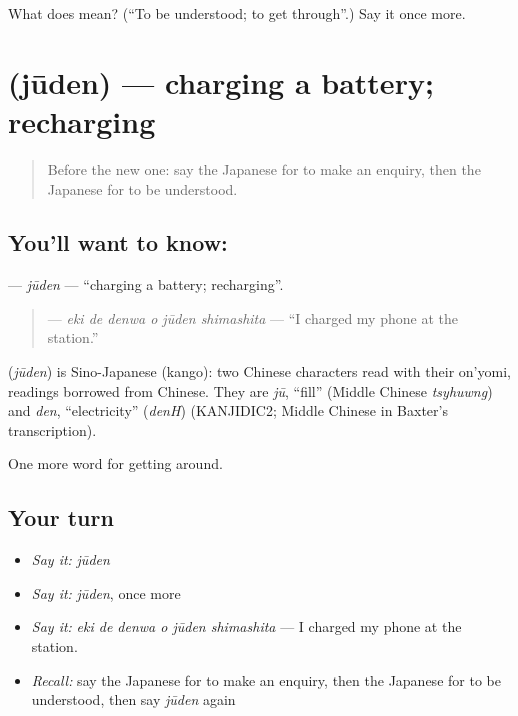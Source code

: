 \begin{tcolorbox}[breakable,colback=teal!4,colframe=teal!35!black,title={Before you move on}]
What does  mean? (\textquotedblleft{}To be understood; to get through\textquotedblright{}.) Say it once more.
\end{tcolorbox}
\section[\texorpdfstring{\ja{じゅうでん} (jūden)}{じゅうでん (jūden)}]{ (jūden) — charging a battery; recharging}

\label{lesson:JA-C425-juuden}



\begin{quote}
Before the new one: say the Japanese for to make an enquiry, then the Japanese for to be understood.
\end{quote}

\subsection*{You'll want to know: }
\textbf{} — \emph{jūden} — \textquotedblleft{}charging a battery; recharging\textquotedblright{}.

\begin{quote}
\textbf{  } — \emph{eki de denwa o jūden shimashita} — \textquotedblleft{}I charged my phone at the station.\textquotedblright{}
\end{quote}

\begin{cousinweb}
\textbf{} (\emph{jūden}) is Sino-Japanese (kango): two Chinese characters read with their on'yomi, readings borrowed from Chinese. They are \emph{jū}, \textquotedblleft{}fill\textquotedblright{} (Middle Chinese \emph{tsyhuwng}) and \emph{den}, \textquotedblleft{}electricity\textquotedblright{} (\emph{denH}) (KANJIDIC2; Middle Chinese in Baxter's transcription).
\end{cousinweb}

\begin{grammarlens}[title={What you've built}]
One more word for getting around.
\end{grammarlens}

\subsection*{Your turn}
\begin{itemize}
\raggedright
  \item \emph{Say it:} \emph{jūden}
  \item \emph{Say it:} \emph{jūden}, once more
  \item \emph{Say it:} \emph{eki de denwa o jūden shimashita} — I charged my phone at the station.
  \item \emph{Recall:} say the Japanese for to make an enquiry, then the Japanese for to be understood, then say \emph{jūden} again
\end{itemize}

